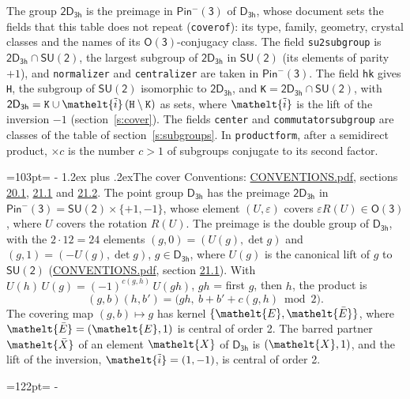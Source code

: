 \documentclass[10pt,a4paper]{article}
\makeatletter
\renewcommand\section{\@startsection{section}{1}{\z@}{-3ex plus -1ex minus -.2ex}%
  {1.2ex plus .2ex}{\normalfont\large\sffamily\bfseries\color{parttitle}}}
\newcommand{\needspace}[1]{\par\penalty-100\begingroup\dimen0=#1\relax\dimen2=\pagegoal
  \advance\dimen2-\pagetotal\ifdim\dimen0>\dimen2\relax\ifdim\dimen2>0pt\vfil\break\fi\fi
  \endgroup}
\numberwithin{equation}{section}
\newcommand{\eltfont}[1]{{\let\sigma\eltsigma\mathelt{#1}}}
\newcommand{\grp}[1]{\mathsf{#1}}
\newcommand{\elt}[1]{\eltfont{#1}}
\newcommand{\dirprod}{\times}
\newcommand{\barred}[1]{\bar{#1}}
\newcommand{\lift}[1]{\tilde{#1}}
\makeatother
\begin{document}
\leavevmode\label{n:element.inversion}\label{n:group.preimage}The group $\grp{2D_{3h}}$ is the preimage in $\grp{Pin^{-}(3)}$ of \href{../../../rotation/data/pdf/D3h.pdf}{$\grp{D_{3h}}$}, whose document sets the fields that this table does not repeat (\texttt{coverof}): its type, family, geometry, crystal classes and the names of its \href{../../../rotation/data/pdf/O3.pdf}{$\grp{O(3)}$}-conjugacy class. The field \texttt{su2subgroup} is $\grp{2D_{3h}} \cap \grp{SU(2)}$, the largest subgroup of $\grp{2D_{3h}}$ in $\grp{SU(2)}$ (its elements of parity $+1$), and \texttt{normalizer} and \texttt{centralizer} are taken in $\grp{Pin^{-}(3)}$. The field \texttt{hk} gives \texttt{H}, the subgroup of $\grp{SU(2)}$ isomorphic to $\grp{2D_{3h}}$, and \texttt{K}${} = \grp{2D_{3h}} \cap \grp{SU(2)}$, with $\grp{2D_{3h}} = \texttt{K} \cup \elt{\lift{i}}\,(\texttt{H} \setminus \texttt{K})$ as sets, where $\elt{\lift{i}}$ is the lift of the inversion $-1$ (section~\ref{s:cover}). The fields \texttt{center} and \texttt{commutatorsubgroup} are classes of the table of section~\ref{s:subgroups}.
\leavevmode\label{n:index.conjugates.c}In \texttt{productform}, after a semidirect product, ${\times}c$ is the number $c > 1$ of subgroups conjugate to its second factor.
\needspace{103pt}
\section{The cover}\label{s:cover}
Conventions: \href{../../CONVENTIONS.pdf}{CONVENTIONS.pdf}, sections \href{../../CONVENTIONS.pdf\#conv.20.1}{20.1}, \href{../../CONVENTIONS.pdf\#conv.21.1}{21.1} and \href{../../CONVENTIONS.pdf\#conv.21.2}{21.2}.
\leavevmode\label{n:group.pin.minus}\label{n:group.su2}\label{n:local.pin.sign}\label{n:matrix.covered}\label{n:matrix.lift.su2}\label{n:index.bar}The point group $\grp{D_{3h}}$ has the preimage $\grp{2D_{3h}}$ in $\grp{Pin^{-}(3)} = \grp{SU(2)} \dirprod \{+1, -1\}$, whose element $(U, \varepsilon)$ covers $\varepsilon R(U) \in \grp{O(3)}$, where $U$ covers the rotation $R(U)$. The preimage is the double group of $\grp{D_{3h}}$, with the $2 \cdot 12 = 24$ elements $(g, 0) = (U(g), \det g)$ and $(g, 1) = (-U(g), \det g)$, $g \in \grp{D_{3h}}$, where $U(g)$ is the canonical lift of $g$ to $\grp{SU(2)}$ (\href{../../CONVENTIONS.pdf}{CONVENTIONS.pdf}, section \href{../../CONVENTIONS.pdf\#conv.21.1}{21.1}). \label{n:function.cocycle}With $U(h)\,U(g) = (-1)^{c(g,h)}\,U(gh)$, $gh$ = first $g$, then $h$, the product is
\begin{equation}\label{e:product}(g, b)(h, b') = \bigl(gh,\ b + b' + c(g, h) \bmod 2\bigr).\end{equation}
\leavevmode\label{n:mark.bar}The covering map $(g, b) \mapsto g$ has kernel $\{\elt{E}, \elt{\barred{E}}\}$, where $\elt{\barred{E}} = (\elt{E}, 1)$ is central of order 2. \label{n:element.named}\label{n:mark.lift}The barred partner $\elt{\barred{X}}$ of an element $\elt{X}$ of $\grp{D_{3h}}$ is $(\elt{X}, 1)$, and the lift of the inversion, $\elt{\lift{i}} = (1, -1)$, is central of order 2.
\needspace{122pt}
\end{document}
